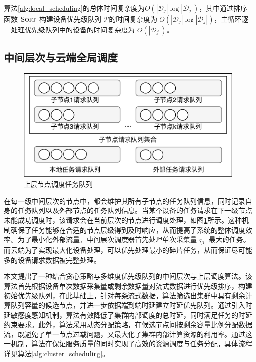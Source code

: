 算法\ref{alg:local_scheduling}的总体时间复杂度为$O(|\mathcal{D}_j| \log |\mathcal{D}_j|)$，其中通过排序函数 $\textsc{Sort}$ 构建设备优先级队列 $\mathcal{P}$的时间复杂度为 $O(|\mathcal{D}_j| \log |\mathcal{D}_j|)$，主循环逐一处理优先级队列中的设备的时间复杂度为 $O(|\mathcal{D}_j|)$。

\subsection{中间层次与云端全局调度}

\begin{figure}[h]
  \centering
  \includegraphics[width=0.8\linewidth]{pics/3-11集群调度.png}
  \caption{上层节点调度任务队列}
  \label{fig:3-11cluster}
\end{figure}

在每一级中间层次的节点中，都会维护其所有子节点的任务队列信息，同时记录自身的任务队列以及外部节点的任务队列信息。当某个设备的任务请求在下一级节点未能成功调度时，该请求会在当前层次的节点进行调度处理，如图\ref{fig:3-11cluster}所示。这种机制确保了任务能够在合适的节点层级得到及时响应，从而提高了系统的整体调度效率。为了最小化外部流量，中间层次调度器首先处理单次采集量$\varsigma_\beta$ 最大的任务。而云端为了实现最大化设备处理，可以优先处理最小的碎片任务，从而保证尽可能多的设备请求数据被完整处理。

本文提出了一种结合贪心策略与多维度优先级队列的中间层次与上层调度算法。该算法首先根据设备单次数据采集量或剩余数据量对流式数据进行优先级排序，构建初始优先级队列，在此基础上，针对每条流式数据，算法筛选出集群中具有剩余计算队列容量的候选节点，并进一步依据端到端时延建立时延优先队列。通过引入时延敏感度感知机制，算法有效降低了集群内部调度的总时延，同时满足任务的时延约束要求。此外，算法采用动态分配策略，在候选节点间按剩余容量比例分配数据流，既避免了单一节点过载问题，又最大化了集群内部计算资源的利用率。通过这一机制，算法在保证服务质量的同时实现了高效的资源调度与任务分配，具体流程详见算法\ref{alg:cluster_scheduling}。

